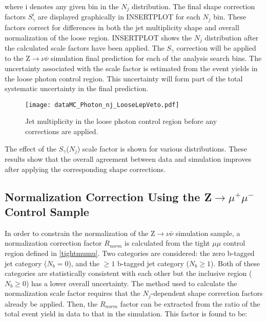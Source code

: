 \noindent where i denotes any given bin in the $N_j$ distribution. The final shape correction factors $S^{i}_{\gamma}$ are displayed graphically in INSERTPLOT for each $N_j$ bin. These factors correct for differences in both the jet multiplicity shape and overall normalization of the loose region. INSERTPLOT shows the $N_j$ distribution after the calculated scale factors have been applied. The $S_{\gamma}$ correction will be applied to the Z$\rightarrow\nu\bar{\nu}$ simulation final prediction for each of the analysis search bins. The uncertainty associated with the scale factor is estimated from the event yields in the loose photon control region. This uncertainty will form part of the total systematic uncertainty in the final prediction.

\begin{figure}[H]
\begin{center}
\texttt{[image: dataMC\_Photon\_nj\_LooseLepVeto.pdf]}
\end{center}
\vspace{-1em}
\caption{Jet multiplicity in the loose photon control region before any corrections are applied.}
\label{NjetsCR}
\end{figure}

\vspace{1em}

The effect of the $S_{\gamma}$($N_j$) scale factor is shown for various distributions. These results show that the overall agreement between data and simulation improves after applying the corresponding shape corrections.

\subsection{Normalization Correction Using the Z$\rightarrow\mu^{+}\mu^{-}$ Control Sample}

In order to constrain the normalization of the Z$\rightarrow\nu\bar{\nu}$ simulation sample, a normalization correction factor $R_{norm}$ is calculated from the tight $\mu\mu$ control region defined in \autoref{tightmumu}. Two categories are considered: the zero b-tagged jet category ($N_b = 0$), and the $\geq 1$ b-tagged jet category ($N_b \geq 1$). Both of these categories are statistically consistent with each other but the inclusive region ($N_b \geq 0$) has a lower overall uncertainty. The method used to calculate the normalization scale factor requires that the $N_j$-dependent shape correction factors already be applied. Then, the $R_{norm}$ factor can be extracted from the ratio of the total event yield in data to that in the simulation. This factor is found to be:

